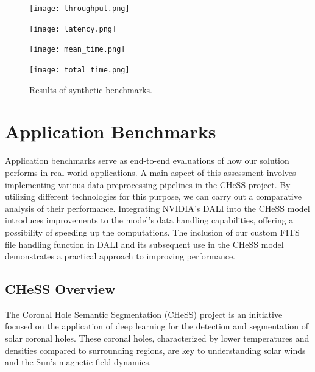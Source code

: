 \documentclass[licencjacka,en]{pracamgr}
\begin{document}
\begin{figure}[htbp]
    \centering
    \vspace{1cm} %
    \begin{minipage}{.45\textwidth}
        \centering
        \texttt{[image: throughput.png]}
    \end{minipage}\hfill
    \begin{minipage}{.45\textwidth}
        \centering
        \texttt{[image: latency.png]}
    \end{minipage}

    \vspace{1cm} %
    
    \begin{minipage}{.45\textwidth}
        \centering
        \texttt{[image: mean\_time.png]}
    \end{minipage}\hfill
    \begin{minipage}{.45\textwidth}
        \centering
        \texttt{[image: total\_time.png]}
    \end{minipage}
    \caption{Results of synthetic benchmarks.}
    \label{CPUvsGPUjpeg}
\end{figure}



\section{\label{chess}Application Benchmarks}

Application benchmarks serve as end-to-end evaluations of how our solution performs in real-world applications. A main aspect of this assessment involves implementing various data preprocessing pipelines in the CHeSS project. By utilizing different technologies for this purpose, we can carry out a comparative analysis of their performance. Integrating NVIDIA's DALI into the CHeSS model introduces improvements to the model's data handling capabilities, offering a possibility of speeding up the computations. The inclusion of our custom FITS file handling function in DALI and its subsequent use in the CHeSS model demonstrates a practical approach to improving performance.

\subsection{CHeSS Overview}
The Coronal Hole Semantic Segmentation (CHeSS) project \cite{CHeSS} is an initiative focused on the application of deep learning for the detection and segmentation of solar coronal holes. These coronal holes, characterized by lower temperatures and densities compared to surrounding regions, are key to understanding solar winds and the Sun’s magnetic field dynamics.
\end{document}
